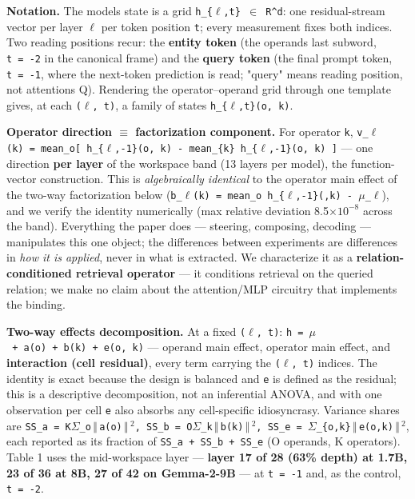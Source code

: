 \textbf{Notation.} The model\textquotesingle s state is a grid
\texttt{h\_\{\ensuremath{\ell},t\}\ \ensuremath{\in}\ R\^{}d}: one residual-stream vector per layer
\texttt{\ensuremath{\ell}} per token position \texttt{t}; every measurement fixes both
indices. Two reading positions recur: the \textbf{entity token} (the
operand\textquotesingle s last subword, \texttt{t\ =\ -2} in the
canonical frame) and the \textbf{query token} (the final prompt token,
\texttt{t\ =\ -1}, where the next-token prediction is read; "query"
means reading position, not attention\textquotesingle s Q). Rendering
the operator--operand grid through one template gives, at each
\texttt{(\ensuremath{\ell},\ t)}, a family of states \texttt{h\_\{\ensuremath{\ell},t\}(o,\ k)}.

\textbf{Operator direction \ensuremath{\equiv} factorization component.} For operator
\texttt{k},
\texttt{v\_\ensuremath{\ell}(k)\ =\ mean\_o{[}\ h\_\{\ensuremath{\ell},-1\}(o,\ k)\ -\ mean\_\{k\textquotesingle{}\}\ h\_\{\ensuremath{\ell},-1\}(o,\ k\textquotesingle{})\ {]}}
--- one direction \textbf{per layer} of the workspace band (13 layers
per model), the function-vector construction. This is
\emph{algebraically identical} to the operator main effect of the
two-way factorization below
(\texttt{b\_\ensuremath{\ell}(k)\ =\ mean\_o\ h\_\{\ensuremath{\ell},-1\}(\textperiodcentered{},k)\ -\ \ensuremath{\mu}\_\ensuremath{\ell}}), and we verify
the identity numerically (max relative deviation 8.5\ensuremath{\times}\ensuremath{10^{-8}} across the
band). Everything the paper does --- steering, composing, decoding ---
manipulates this one object; the differences between experiments are
differences in \emph{how it is applied}, never in what is extracted. We
characterize it as a \textbf{relation-conditioned retrieval operator}
--- it conditions retrieval on the queried relation; we make no claim
about the attention/MLP circuitry that implements the binding.

\textbf{Two-way effects decomposition.} At a fixed \texttt{(\ensuremath{\ell},\ t)}:
\texttt{h\ =\ \ensuremath{\mu}\ +\ a(o)\ +\ b(k)\ +\ e(o,\ k)} --- operand main effect,
operator main effect, and \textbf{interaction (cell residual)}, every
term carrying the \texttt{(\ensuremath{\ell},\ t)} indices. The identity is exact
because the design is balanced and \texttt{e} is defined as the
residual; this is a descriptive decomposition, not an inferential ANOVA,
and with one observation per cell \texttt{e} also absorbs any
cell-specific idiosyncrasy. Variance shares are
\texttt{SS\_a\ =\ K\textperiodcentered{}\ensuremath{\Sigma}\_o\ensuremath{\,\Vert\,}a(o)\ensuremath{\,\Vert\,}\ensuremath{^{2}},\ SS\_b\ =\ O\textperiodcentered{}\ensuremath{\Sigma}\_k\ensuremath{\,\Vert\,}b(k)\ensuremath{\,\Vert\,}\ensuremath{^{2}},\ SS\_e\ =\ \ensuremath{\Sigma}\_\{o,k\}\ensuremath{\,\Vert\,}e(o,k)\ensuremath{\,\Vert\,}\ensuremath{^{2}}},
each reported as its fraction of \texttt{SS\_a\ +\ SS\_b\ +\ SS\_e} (O
operands, K operators). Table 1 uses the mid-workspace layer ---
\textbf{layer 17 of 28 (63\% depth) at 1.7B, 23 of 36 at 8B, 27 of 42 on
Gemma-2-9B} --- at \texttt{t\ =\ -1} and, as the control,
\texttt{t\ =\ -2}.

